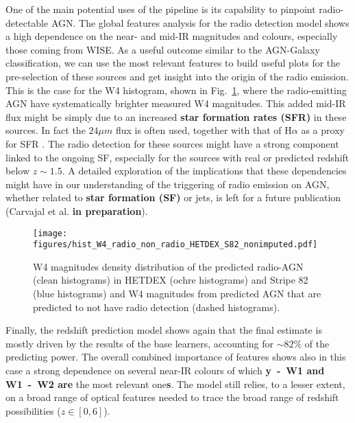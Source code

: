 \documentclass{aa}
\begin{document}
One of the main potential uses of the pipeline is its capability to pinpoint radio-detectable AGN. The global features analysis for the radio detection model shows a high dependence on the near- and mid-IR magnitudes and colours, especially those coming from WISE. As a useful outcome similar to the AGN-Galaxy classification, we can use the most relevant features to build useful plots for the pre-selection of these sources and get insight into the origin of the radio emission. This is the case for the W4 histogram, shown in Fig.~\ref{fig:hist_W4_nonimputed_pred_radio_non_radio_AGN}, where the radio-emitting AGN have systematically brighter measured W4 magnitudes. This added mid-IR flux might be simply due to an increased \textbf{star formation rates (SFR)} in these sources. In fact the $24\mu m$ flux is often used, together with that of H$\alpha$ as a proxy for SFR \citep{2009ApJ...703.1672K}. The radio detection for these sources might have a strong component linked to the ongoing SF, especially for the sources with real or predicted redshift below ${z {\sim} 1.5}$. A detailed exploration of the implications that these dependencies might have in our understanding of the triggering of radio emission on AGN, whether related to \textbf{star formation (SF)} or jets, is left for a future publication (Carvajal et al. \textbf{in preparation}).

\begin{figure}
  \centering
    \texttt{[image: figures/hist\_W4\_radio\_non\_radio\_HETDEX\_S82\_nonimputed.pdf]}
  \caption{W4 magnitudes density distribution of the predicted radio-AGN  (clean histograms) in HETDEX (ochre histograms) and Stripe 82 (blue histograms) and W4 magnitudes from predicted AGN that are predicted to not have radio detection (dashed histograms).}
  \label{fig:hist_W4_nonimputed_pred_radio_non_radio_AGN}
\end{figure}

Finally, the redshift prediction model shows again that the final estimate is mostly driven by the results of the base learners, accounting for ${\sim} 82\%$ of the predicting power. The overall combined importance of features shows also in this case a strong dependence on several near-IR colours of which \textbf{y~-~W1 and W1~-~W2 are} the most relevant one\textbf{s}. 
The model still relies, to a lesser extent, on a broad range of optical features needed to trace the broad range of redshift possibilities ($z \in [0,6]$).%
\end{document}
